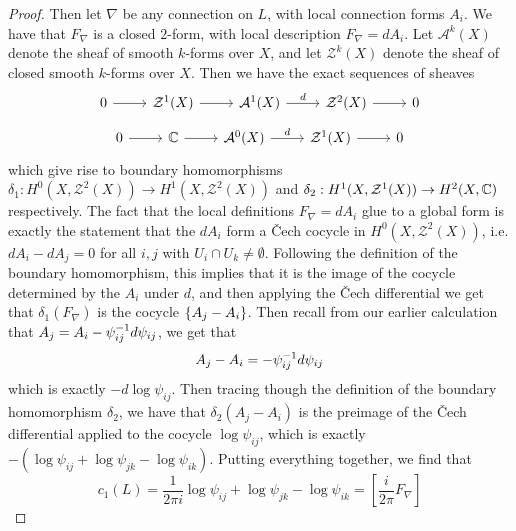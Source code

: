 \begin{proof}
Then let $\nabla$ be any connection on $L$, with local connection forms $A_i$.
We have that $F_\nabla$ is a closed $2$-form, with local description $F_\nabla = dA_i$.
Let $\mathcal{A}^k(X)$ denote the sheaf of smooth $k$-forms over $X$, and
let $\mathcal{Z}^k(X)$ denote the sheaf of closed smooth $k$-forms over $X$.
Then we have the exact sequences of sheaves
\[\begin{tikzcd}
0 \ar[r] & \mathcal{Z}^1(X) \ar[r] & \mathcal{A}^1(X) \ar[r, "d"] & \mathcal{Z}^2(X)
\ar[r] & 0
\end{tikzcd}\]
\[\begin{tikzcd}
0 \ar[r] & \C \ar[r] & \mathcal{A}^0(X) \ar[r, "d"] & \mathcal{Z}^1(X) \ar[r] & 0
\end{tikzcd}\]
which give rise to boundary homomorphisms
$\delta_1 : H^0(X, \mathcal{Z}^2(X)) \to H^1(X, \mathcal{Z}^2(X))$ and
$\delta_2 : H^1(X, \mathcal{Z}^1(X)) \to H^2(X, \mathbb{C})$ respectively. The
fact that the local definitions $F_\nabla = dA_i$ glue to a global form
is exactly the statement that the $dA_i$ form a \v{C}ech cocycle in
$H^0(X, \mathcal{Z}^2(X))$, i.e. $dA_i - dA_j = 0$ for all $i,j$ with
$U_i \cap U_k \neq \emptyset$. Following the definition of the boundary homomorphism,
this implies that it is the image of the cocycle determined by the $A_i$ under
$d$, and then applying the \v{C}ech differential we get that
$\delta_1(F_\nabla)$ is the cocycle $\left\lbrace A_j - A_i \right\rbrace$. Then recall from our earlier
calculation that $A_j = A_i - \psi_{ij}^{-1} d\psi_{ij}$, we get that
\[
A_j - A_i = -\psi_{ij}^{-1} d\psi_{ij}
\]
which is exactly $-d\log\psi_{ij}$. Then tracing though the definition of the
boundary homomorphism $\delta_2$, we have that $\delta_2(A_j - A_i)$
is the preimage of the \v{C}ech differential applied to the cocycle
$\log\psi_{ij}$, which is exactly $-(\log\psi_{ij} + \log\psi_{jk} - \log\psi_{ik})$.
Putting everything together, we find that
\[
c_1(L) = \frac{1}{2\pi i}\log\psi_{ij} + \log\psi_{jk} - \log\psi_{ik}
= \left[ \frac{i}{2\pi}F_\nabla \right]
\]
\end{proof}
%